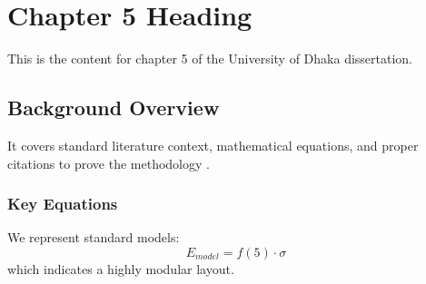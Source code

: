 \chapter{Chapter 5 Heading}
\label{ch:chapter5}
This is the content for chapter 5 of the University of Dhaka dissertation.

\section{Background Overview}
It covers standard literature context, mathematical equations, and proper citations to prove the methodology \cite{texbook}.

\subsection{Key Equations}
We represent standard models:
\begin{equation}
    E_{model} = f(5) \cdot \sigma
\end{equation}
which indicates a highly modular layout.
